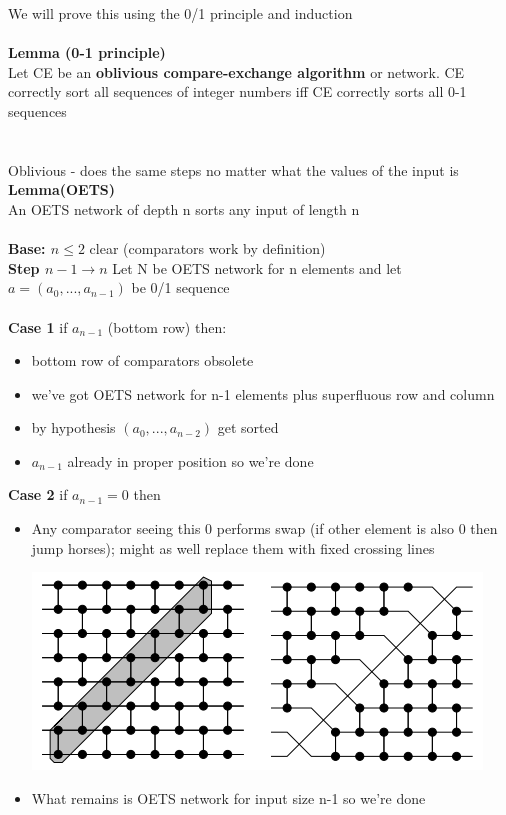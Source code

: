 \documentclass{article}[18pt]
\begin{document}
We will prove this using the 0/1 principle and induction\\
\\
\textbf{Lemma (0-1 principle)}\\
Let CE be an \textbf{oblivious compare-exchange algorithm} or network. CE correctly sort all sequences of integer numbers iff CE correctly sorts all 0-1 sequences\\
\\
\\ Oblivious - does the same steps no matter what the values of the input is\\
\textbf{Lemma(OETS)}\\
An OETS network of depth n sorts any input of length n\\
\\
\textbf{Base: $n\leqslant 2$} clear (comparators work by definition)\\
\textbf{Step $n-1\rightarrow n$} Let N be OETS network for n elements and let $a=(a_0,...,a_{n-1})$ be 0/1 sequence\\
\\
\textbf{Case 1} if $a_{n-1}$ (bottom row) then:
\begin{itemize}
	\item bottom row of comparators obsolete
	\item we've got OETS network for n-1 elements plus superfluous row and column
	\item by hypothesis $(a_0,...,a_{n-2})$ get sorted
	\item $a_{n-1}$ already in proper position so we're done
\end{itemize}
\textbf{Case 2} if $a_{n-1}=0$ then
\begin{itemize}
	\item Any comparator seeing this 0 performs swap (if other element is also 0 then jump horses); might as well replace them with fixed crossing lines
	\begin{center}
		\includegraphics[scale=0.7]{networkProof}
	\end{center}
	\item What remains is OETS network for input size n-1 so we're done
\end{itemize}
\end{document}
